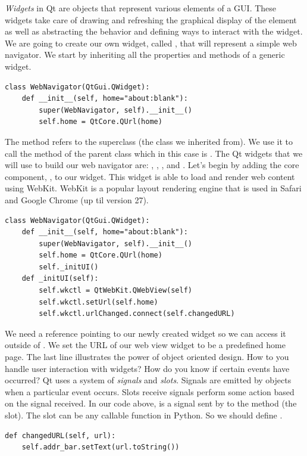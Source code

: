 \emph{Widgets} in Qt are objects that represent various elements of a GUI.
These widgets take care of drawing and refreshing the graphical display of the element as well as abstracting the behavior and defining ways to interact with the widget.
We are going to create our own widget, called , that will represent a simple web navigator.
We start by inheriting all the properties and methods of a generic widget.
\begin{lstlisting}
class WebNavigator(QtGui.QWidget):
    def __init__(self, home="about:blank"):
        super(WebNavigator, self).__init__()
        self.home = QtCore.QUrl(home)
\end{lstlisting}
The  method refers to the superclass (the class we inherited from).
We use it to call the  method of the parent class which in this case is .
The Qt widgets that we will use to build our web navigator are: , , , and .
Let's begin by adding the core component, , to our widget.
This widget is able to load and render web content using WebKit.
WebKit is a popular layout rendering engine that is used in Safari and Google Chrome (up til version 27).
\begin{lstlisting}
class WebNavigator(QtGui.QWidget):
    def __init__(self, home="about:blank"):
        super(WebNavigator, self).__init__()
        self.home = QtCore.QUrl(home)
        self._initUI()
    def _initUI(self):
        self.wkctl = QtWebKit.QWebView(self)
        self.wkctl.setUrl(self.home)
        self.wkctl.urlChanged.connect(self.changedURL)
\end{lstlisting}
We need a reference pointing to our newly created  widget so we can access it outside of .
We set the URL of our web view widget to be a predefined home page.  
The last line illustrates the power of object oriented design.
How to you handle user interaction with widgets?
How do you know if certain events have occurred?
Qt uses a system of \emph{signals} and \emph{slots}.
Signals are emitted by objects when a particular event occurs.
Slots receive signals perform some action based on the signal received.
In our code above,  is a signal sent by  to the method  (the slot).
The slot can be any callable function in Python.
So we should define .
\begin{lstlisting}
def changedURL(self, url):
    self.addr_bar.setText(url.toString())
\end{lstlisting}
